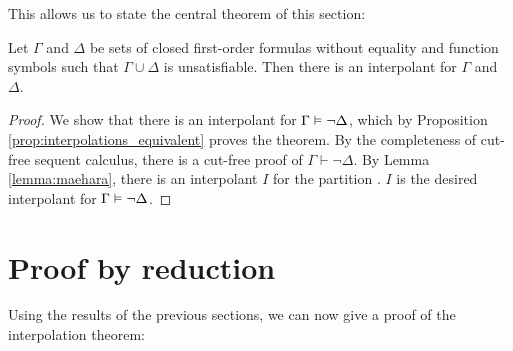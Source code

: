 

This allows us to state the central theorem of this section:
\begin{thm}
	\label{thm:prop_interpol}
	Let $\Gamma$ and $\Delta$ be sets of closed first-order formulas without equality and function symbols such that $\Gamma \cup \Delta$ is unsatisfiable. Then there is an interpolant for $\Gamma$ and~$\Delta$.
\end{thm}
\begin{proof}
	We show that there is an interpolant for $\Gamma \vDash \lnot \Delta$, which
	by Proposition \ref{prop:interpolations_equivalent} proves the theorem.
	By the completeness of cut-free sequent calculus, there is a cut-free proof of $\Gamma \vdash \lnot \Delta$.
	By Lemma \ref{lemma:maehara}, there is an interpolant $I$ for the partition \parti{\Gamma}{}{}{\lnot \Delta}.
	$I$ is the desired interpolant for $\Gamma\vDash\lnot\Delta$.

\end{proof}



		\section{Proof by reduction}

		Using the results of the previous sections, we can now give a proof of the interpolation theorem:

